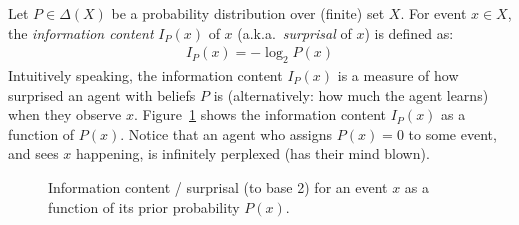 \documentclass[nobib,nofonts]{tufte-handout}
\begin{document}
Let $P\in \Delta(X)$ be a probability distribution over (finite) set $X$.
For event $x \in X$, the \emph{information content} $I_{P}(x)$ of $x$ (a.k.a.~\emph{surprisal} of $x$) is defined as:
\begin{align*}
  I_{P}(x) = - \log_{2} P(x)
\end{align*}
Intuitively speaking, the information content $I_{P}(x)$ is a measure of how surprised an agent with beliefs $P$ is (alternatively: how much the agent learns) when they observe $x$.
Figure~\ref{fig:log-surprisal} shows the information content $I_{P}(x)$ as a function of $P(x)$.
Notice that an agent who assigns $P(x) = 0$ to some event, and sees $x$ happening, is infinitely perplexed (has their mind blown).

\begin{figure}
  \centering


{}

\caption{Information content / surprisal (to base 2) for an event $x$ as a function of its prior probability $P(x)$.}
\label{fig:log-surprisal}
\end{figure}
\end{document}
